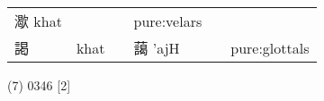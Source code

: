\documentclass[14pt,a4paper]{scrartcl}
\begin{document}
\begin{longtable}[c]{@{}llllll@{}}
\begin{minipage}[t]{0.14\columnwidth}\raggedright\strut
㵣 khat
\strut\end{minipage} &
\begin{minipage}[t]{0.14\columnwidth}\raggedright\strut
\strut\end{minipage} &
\begin{minipage}[t]{0.14\columnwidth}\raggedright\strut
\strut\end{minipage} &
\begin{minipage}[t]{0.14\columnwidth}\raggedright\strut
pure:velars
\strut\end{minipage}\tabularnewline
\begin{minipage}[t]{0.14\columnwidth}\raggedright\strut
謁
\strut\end{minipage} &
\begin{minipage}[t]{0.14\columnwidth}\raggedright\strut
khat
\strut\end{minipage} &
\begin{minipage}[t]{0.14\columnwidth}\raggedright\strut
\strut\end{minipage} &
\begin{minipage}[t]{0.14\columnwidth}\raggedright\strut
藹 'ajH
\strut\end{minipage} &
\begin{minipage}[t]{0.14\columnwidth}\raggedright\strut
\strut\end{minipage} &
\begin{minipage}[t]{0.14\columnwidth}\raggedright\strut
pure:glottals
\strut\end{minipage}\tabularnewline
\bottomrule
\end{longtable}

(7) 0346 {[}2{]}
\end{document}
